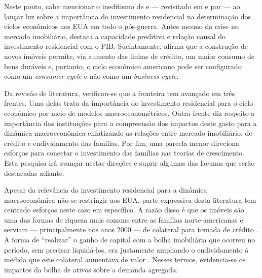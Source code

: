 Neste ponto, cabe mencionar o ineditismo de \textcite{green_follow_1997} e \textcite{leamer_housing_2007} --- revisitado em \textcite{leamer_housing_2015} e por \textcite{fiebiger_semi-autonomous_2018} --- ao lançar luz sobre a importância do investimento residencial na determinação dos ciclos econômicos nos EUA em todo o pós-guerra.
Antes mesmo da crise no mercado imobiliário,
\textcite{leamer_housing_2007} destaca a capacidade preditiva e relação causal  do investimento residencial com o PIB. Sucintamente, afirma que a construção de novos imóveis permite, via aumento das linhas de crédito, um maior consumo de bens duráveis e, portanto, o ciclo econômico americano pode ser configurado como um \textit{consumer cycle} e não como um \textit{business cycle}.

Da revisão de literatura, verificou-se que a fronteira tem avançado em três frentes. Uma delas trata da importância do investimento residencial para o ciclo econômico por meio de modelos macroeconométricos.
Outra frente  diz respeito a importância das instituições para a compreensão dos impactos deste gasto para a dinâmica macroeconômica enfatizando as relações entre mercado imobiliário, de crédito e endividamento das famílias. 
Por fim, uma parcela menor direciona esforços para conectar o investimento das famílias nas teorias de crescimento. Esta pesquisa irá avançar nestas direções e suprir algumas das lacunas que serão destacadas adiante.

Apesar da relevância do investimento residencial para a dinâmica macroeconômica não se restringir aos EUA, parte expressiva desta literatura tem centrado esforços neste caso em específico. A razão disso é que os imóveis são  uma das formas de riqueza mais comuns entre as famílias norte-americanas e serviam --- principalmente nos anos 2000 --- de colateral para tomada de crédito \cite{teixeira_uma_2011}. A forma de ``realizar'' o ganho de capital com a bolha imobiliária que ocorreu no período, sem precisar liquidá-los, era justamente ampliando o endividamento à medida que este colateral aumentava de valor \cite{teixeira_crescimento_2015}. Nesses termos, evidencia-se os impactos da bolha de ativos sobre a demanda agregada. 


